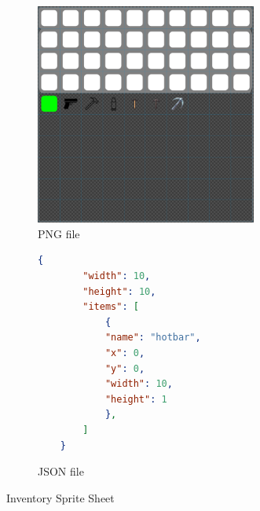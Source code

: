 \begin{figure}[h]
    \centering
    \begin{subfigure}{0.45\textwidth}
        \centering
        \includegraphics[width=0.8\textwidth]{chapters/implementation/sections/two_dimensional_graphics/resources/SpriteSheet.png}
        \caption{PNG file}
        \label{fig:inventory_texture}
    \end{subfigure}\hfill
    \begin{subfigure}{0.45\textwidth}
        \begin{lstlisting}[language=json,firstline=1]
    {
        "width": 10,
        "height": 10,
        "items": [
            {
            "name": "hotbar",
            "x": 0,
            "y": 0,
            "width": 10,
            "height": 1
            },
        ]
    }
    \end{lstlisting}

        \caption{JSON file}
        \label{lst:inventory_sprite_sheet_json}
    \end{subfigure}

    \caption{Inventory Sprite Sheet}
\end{figure}